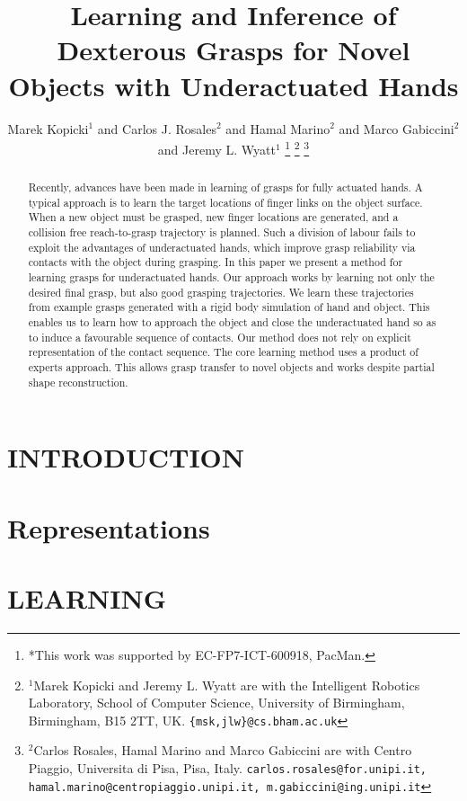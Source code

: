 \documentclass[a4paper, 10pt, conference]{ieeeconf}
\title{\LARGE \bf
Learning and Inference of Dexterous Grasps for Novel Objects with Underactuated Hands
}
\author{Marek Kopicki$^{1}$ and Carlos J. Rosales$^{2}$ and Hamal Marino$^{2}$ and Marco Gabiccini$^{2}$ and Jeremy L. Wyatt$^{1}$%
\thanks{*This work was supported by EC-FP7-ICT-600918, PacMan.}%
\thanks{$^{1}$Marek Kopicki and Jeremy L. Wyatt are with the Intelligent Robotics Laboratory, School of Computer Science,
        University of Birmingham, Birmingham, B15 2TT, UK.
        {\tt\small \{msk,jlw\}@cs.bham.ac.uk}}%
\thanks{$^{2}$Carlos Rosales, Hamal Marino and Marco Gabiccini are with Centro Piaggio, Universita di Pisa, Pisa, Italy.
               {\tt\small carlos.rosales@for.unipi.it, hamal.marino@centropiaggio.unipi.it, m.gabiccini@ing.unipi.it}}%
}
\begin{document}
\maketitle
\thispagestyle{empty}
\pagestyle{empty}


\begin{abstract}
Recently, advances have been made in learning of grasps for fully actuated hands. A typical approach is to learn the target locations of finger links on the object surface. When a new object must be grasped, new finger locations are generated, and a collision free reach-to-grasp trajectory is planned. Such a division of labour fails to exploit the advantages of underactuated hands, which improve grasp reliability via contacts with the object during grasping. In this paper we present a method for learning grasps for underactuated hands. Our approach works by learning not only the desired final grasp, but also good grasping trajectories. We learn these trajectories from example grasps generated with a rigid body simulation of hand and object. This enables us to learn how to approach the object and close the underactuated hand so as to induce a favourable sequence of contacts. Our method does not rely on explicit representation of the contact sequence. The core learning method uses a product of experts approach. This allows grasp transfer to novel objects and works despite partial shape reconstruction.
\end{abstract}


\section{INTRODUCTION}
\label{sec:introduction}



\section{Representations}
\label{sec:representations}


\section{LEARNING}

\end{document}

